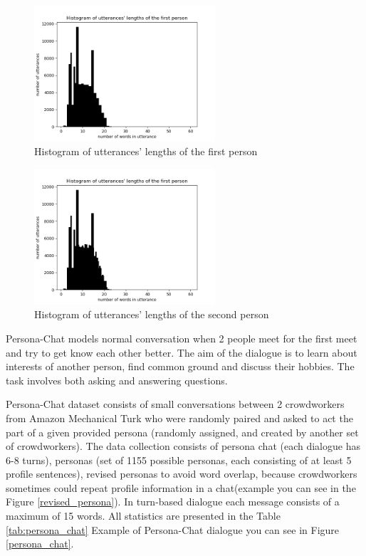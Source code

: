 \begin{figure}[hbt]
  \centering
  \includegraphics[width=0.6\textwidth]{figures/uttr1_length.png}
  \caption{Histogram of utterances' lengths of the first person}
  \label{histogram_uttr1_length}
\end{figure}

\begin{figure}[hbt]
  \centering
  \includegraphics[width=0.6\textwidth]{figures/uttr2_length.png}
  \caption{Histogram of utterances' lengths of the second person}
  \label{histogram_uttr2_length}
\end{figure}

Persona-Chat models normal conversation when 2 people meet for the first meet and try to get know each other better. The aim of the dialogue is to learn about interests of another person, find common ground and discuss their hobbies. The task involves both asking and answering questions. 

Persona-Chat dataset consists of small conversations between 2 crowdworkers from Amazon Mechanical Turk who were randomly paired and asked to act the part of a given provided persona (randomly assigned, and created by another set of crowdworkers). The data collection consists of persona chat (each dialogue has 6-8 turns), personas (set of 1155 possible personas, each consisting of at least 5 profile sentences), revised personas to avoid word overlap, because crowdworkers sometimes could repeat profile information in a chat(example you can see in the Figure \ref{revised_persona}). In turn-based dialogue each message consists of a maximum of 15 words. All statistics are presented in the Table \ref{tab:persona_chat} Example of Persona-Chat dialogue you can see in Figure \ref{persona_chat}. 


